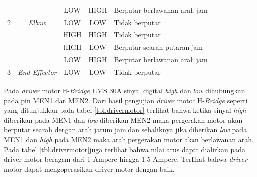 \begin{table}[H]
\begin{tabular}{|c|c|c|c|l|l|}
			&                                                          & LOW                          & HIGH                         & Berputar berlawanan arah jam                                           &                                                                          \\ \cline{3-6} 
			\multirow{-4}{*}{2}                          & \multirow{-4}{*}{\textit{Elbow}}                         & LOW                          & LOW                          & Tidak berputar                                                         &                                                                          \\ \hline
			&                                                          & HIGH                         & HIGH                         & Tidak berputar                                                         &                                                                          \\ \cline{3-6} 
			&                                                          & HIGH                         & LOW                          & Berputar searah putaran jam                                            &                                                                          \\ \cline{3-6} 
			&                                                          & LOW                          & HIGH                         & Berputar berlawanan arah jam                                           &                                                                          \\ \cline{3-6} 
			\multirow{-4}{*}{3}                          & \multirow{-4}{*}{\textit{End-Effector}}                  & LOW                          & LOW                          & Tidak berputar                                                         &                                                                          \\ \hline
		\end{tabular}
	
\end{table} 

 Pada \textit{driver} motor H-\textit{Bridge} EMS 30A sinyal digital \textit{high} dan \textit{low} dihubungkan pada pin MEN1 dan MEN2. Dari hasil pengujian \textit{driver} motor H-\textit{Bridge} seperti yang ditunjukkan pada tabel \ref{tbl.drivermotor} terlihat bahwa ketika sinyal \textit{high} diberikan pada MEN1 dan \textit{low} diberikan MEN2 maka pergerakan motor akan berputar searah dengan arah jarum jam dan sebaliknya jika diberikan \textit{low} pada MEN1 dan \textit{high} pada MEN2 maka arah pergerakan motor akan berlawanan arah. Pada tabel \ref{tbl.drivermotor}juga terlihat bahwa nilai arus dapat dialirkan pada driver motor beragam dari 1 Ampere hingga 1.5 Ampere. Terlihat bahwa \textit{driver} motor dapat mengoperasikan driver motor dengan baik.

